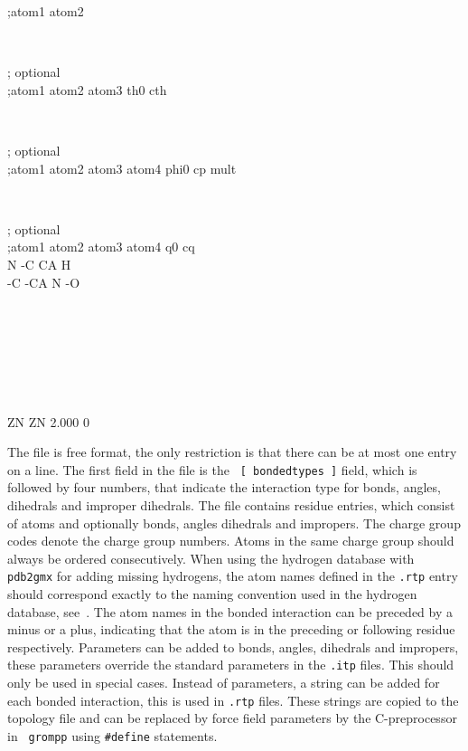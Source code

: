 \begin{small}
\begin{tt}
;atom1 atom2\\
\end{tt}\\
\begin{tt}
 [ angles ]  ; optional\\
;atom1 atom2 atom3    th0    cth\\
\end{tt}\\
\begin{tt}
 [ dihedrals ]  ; optional\\
;atom1 atom2 atom3 atom4   phi0     cp   mult\\
\end{tt}\\
\begin{tt}
 [ impropers ]  ; optional\\
;atom1 atom2 atom3 atom4     q0     cq\\
     N    -C    CA     H\\
    -C   -CA     N    -O\\
\end{tt}\\
\begin{tt}
[ ZN ]\\
\end{tt}\\
\begin{tt}
 [ atoms ]\\
    ZN    ZN   2.000     0\\
\end{tt}
\end{small}

The file is free format, the only restriction is that there can be at
most one entry on a line.  The first field in the file is the {\tt
[~bondedtypes~]} field, which is followed by four numbers, that
indicate the interaction type for bonds, angles, dihedrals and
improper dihedrals.  The file contains residue entries, which consist
of atoms and optionally bonds, angles dihedrals and impropers.  The
charge group codes denote the charge group numbers. Atoms in the same
charge group should always be ordered consecutively. When using the
hydrogen database with {\tt pdb2gmx} for adding missing hydrogens, the
atom names defined in the {\tt .rtp} entry should correspond exactly
to the naming convention used in the hydrogen database,
see~. The atom names in the bonded interaction can be
preceded by a minus or a plus, indicating that the atom is in the
preceding or following residue respectively.  Parameters can be added
to bonds, angles, dihedrals and impropers, these parameters override
the standard parameters in the {\tt .itp} files.  This should only be
used in special cases. Instead of parameters, a string can be added
for each bonded interaction, this is used in  {\tt .rtp}
files. These strings are copied to the topology file and can be
replaced by force field parameters by the C-preprocessor in {\tt
grompp} using {\tt \#define} statements.

